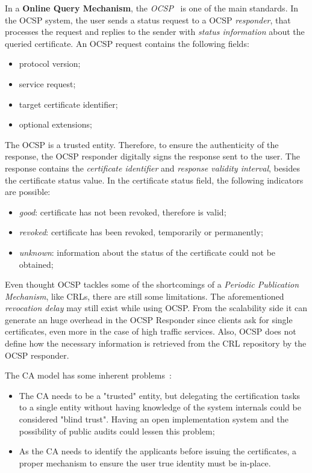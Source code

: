 In a \textbf{Online Query Mechanism}, the \textit{\ac{OCSP}}~\cite{rfc6960} is one of the main standards.
In the \ac{OCSP} system, the user sends a status request to a \ac{OCSP} \textit{responder}, that processes the request and replies to the sender with \textit{status information} about the queried certificate.
An \ac{OCSP} request contains the following fields:
\begin{itemize}
	\item protocol version;
	\item service request;
	\item target certificate identifier;
	\item optional extensions;
\end{itemize}
The \ac{OCSP} is a trusted entity.
Therefore, to ensure the authenticity of the response, the \ac{OCSP} responder digitally signs the response sent to the user.
The response contains the \textit{certificate identifier} and \textit{response validity interval}, besides the certificate status value.
In the certificate status field, the following indicators are possible:
\begin{itemize}
	\item \textit{good}: certificate has not been revoked, therefore is valid;
	\item \textit{revoked}: certificate has been revoked, temporarily or permanently;
	\item \textit{unknown}: information about the status of the certificate could not be obtained;
\end{itemize}

Even thought \ac{OCSP} tackles some of the shortcomings of a \textit{Periodic Publication Mechanism}, like \acp{CRL}, there are still some limitations.
The aforementioned \textit{revocation delay} may still exist while using \ac{OCSP}.
From the scalability side it can generate an huge overhead in the \ac{OCSP} Responder since clients ask for single certificates, even more in the case of high traffic services.
Also, \ac{OCSP} does not define how the necessary information is retrieved from the \ac{CRL} repository by the \ac{OCSP} responder.

The \ac{CA} model has some inherent problems~\cite{Schneier2000}:
\begin{itemize}
	\item The \ac{CA} needs to be a "trusted" entity, but delegating the certification tasks to a single entity without having knowledge of the system internals could be considered "blind trust". Having an open implementation system and the possibility of public audits could lessen this problem;
	\item As the \ac{CA} needs to identify the applicants before issuing the certificates, a proper mechanism to ensure the user true identity must be in-place.
\end{itemize}

